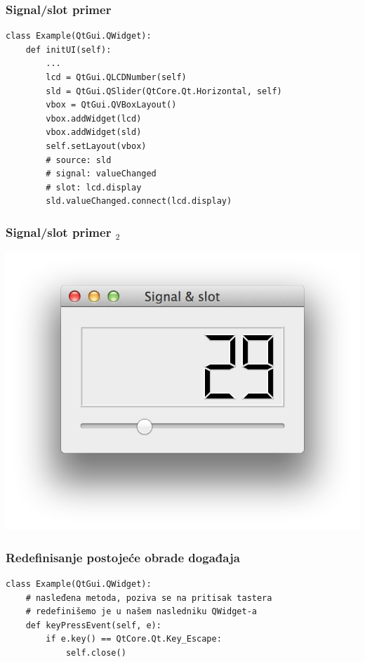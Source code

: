 \documentclass[utf8,compress]{beamer}
\begin{document}
\begin{frame}
  \frametitle{Signal/slot primer}
\begin{verbatim}
class Example(QtGui.QWidget):
    def initUI(self):
        ...
        lcd = QtGui.QLCDNumber(self)
        sld = QtGui.QSlider(QtCore.Qt.Horizontal, self)
        vbox = QtGui.QVBoxLayout()
        vbox.addWidget(lcd)
        vbox.addWidget(sld)
        self.setLayout(vbox)
        # source: sld
        # signal: valueChanged
        # slot: lcd.display
        sld.valueChanged.connect(lcd.display)
\end{verbatim}
\end{frame}

\begin{frame}[fragile]
  \frametitle{Signal/slot primer $_2$}
\begin{center}
\includegraphics[scale=0.5]{pyqt10.png}
\end{center}
\end{frame}

\begin{frame}[fragile]
  \frametitle{Redefinisanje postojeće obrade događaja}
\begin{verbatim}
class Example(QtGui.QWidget):
    # nasleđena metoda, poziva se na pritisak tastera
    # redefinišemo je u našem nasledniku QWidget-a
    def keyPressEvent(self, e):
        if e.key() == QtCore.Qt.Key_Escape:
            self.close() 
\end{verbatim}
\end{frame}
\end{document}
